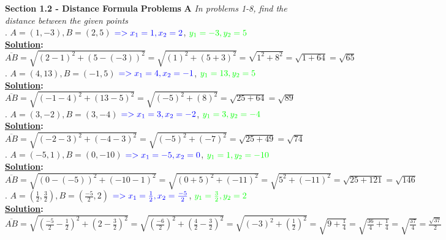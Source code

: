 \documentclass[10pt,letterpaper]{article}
\begin{document}
\textbf{Section 1.2 - Distance Formula}
\newline \textbf{Problems}
\newline \textbf{A}
\newline \textit{In problems 1-8, find the distance between the given points}
\\
. $A=(1,-3), B=(2,5)$ $\color{blue} => x_1=1, x_2=2$, $\color{green}y_1=-3, y_2=5 $\\
\textbf{\underline {Solution}:}\\
\newline$\overline{AB}=\sqrt{(2-1)^2+(5-(-3))^2}=\sqrt{(1)^2+(5+3)^2}=\sqrt{1^2+8^2}=\sqrt{1+64}=\sqrt{65}$\\
. $A=(4,13), B=(-1,5)$ $\color{blue} => x_1 =4, x_2=-1$, $\color{green}y_1=13, y_2=5 $\\
\textbf{\underline {Solution}:}\\
\newline$\overline{AB}=\sqrt{(-1-4)^2+(13-5)^2}=\sqrt{(-5)^2+(8)^2}=\sqrt{25+64}=\sqrt{89}$\\
. $A=(3, -2), B=(3, -4)$ $\color{blue} => x_1 =3, x_2=-2$, $\color{green}y_1=3, y_2=-4 $\\
\textbf{\underline {Solution}:}\\
\newline$\overline{AB}=\sqrt{(-2-3)^2 + (-4-3)^2}=\sqrt{(-5)^2+(-7)^2}=\sqrt{25+49}=\sqrt{74}$\\
. $A=(-5, 1), B=(0, -10)$ $\color{blue} => x_1=-5, x_2=0$, $\color{green}y_1=1, y_2=-10 $\\
\textbf{\underline {Solution}:}\\
\newline$\overline{AB}=\sqrt{(0-(-5))^2+(-10-1)^2}=\sqrt{(0+5)^2+(-11)^2}=\sqrt{5^2+(-11)^2}=\sqrt{25+121}=\sqrt{146}$\\
. $A=(\frac{1}{2}, \frac{3}{2}), B=(\frac{-5}{2}, 2)$ $\color{blue} => x_1=\frac{1}{2}, x_2=\frac{-5}{2}$, $\color{green}y_1=\frac{3}{2}, y_2=2 $\\
\textbf{\underline {Solution}:}\\
\newline$\overline{AB}=\sqrt{(\frac{-5}{2}-\frac{1}{2})^2+(2-\frac{3}{2})^2}=\sqrt{(\frac{-6}{2})^2+(\frac{4}{2}-\frac{3}{2})^2}=\sqrt{(-3)^2+(\frac{1}{2})^2}=\sqrt{9+\frac{1}{4}}=\sqrt{\frac{36}{4}+\frac{1}{4}}=\sqrt{\frac{37}{4}}=\frac{\sqrt{37}}{2}$\\
\end{document}
